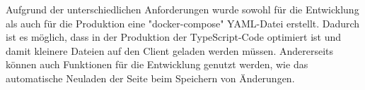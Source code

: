 
Aufgrund der unterschiedlichen Anforderungen wurde sowohl für die Entwicklung als auch für die Produktion eine "docker-compose" YAML-Datei erstellt. 
Dadurch ist es möglich, dass in der Produktion der TypeScript-Code optimiert ist und damit kleinere Dateien auf den Client geladen werden müssen. 
Andererseits können auch Funktionen für die Entwicklung genutzt werden, wie das automatische Neuladen der Seite beim Speichern von Änderungen.




